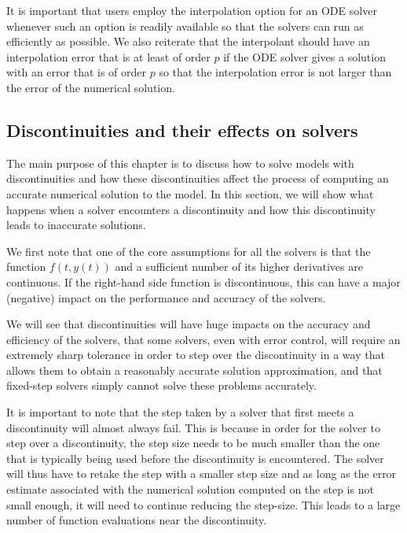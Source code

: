It is important that users employ the interpolation option for an ODE solver whenever such an option is readily available so that the solvers can run as efficiently as possible. We also reiterate that the interpolant should have an interpolation error that is at least of order $p$ if the ODE solver gives a solution with an error that is of order $p$ so that the interpolation error is not larger than the error of the numerical solution.

\subsection{Discontinuities and their effects on solvers}
\label{subsection:effect_of_discontinuity}
The main purpose of this chapter is to discuss how to solve models with discontinuities and how these discontinuities affect the process of computing an accurate numerical solution to the model. In this section, we will show what happens when a solver encounters a discontinuity and how this discontinuity leads to inaccurate solutions.

We first note that one of the core assumptions for all the solvers is that the function $f(t, y(t))$ and a sufficient number of its higher derivatives are continuous. If the right-hand side function is discontinuous, this can have a major (negative) impact on the performance and accuracy of the solvers. 

We will see that discontinuities will have huge impacts on the accuracy and efficiency of the solvers, that some solvers, even with error control, will require an extremely sharp tolerance in order to step over the discontinuity in a way that allows them to obtain a reasonably accurate solution approximation, and that fixed-step solvers simply cannot solve these problems accurately. 

It is important to note that the step taken by a solver that first meets a discontinuity will almost always fail. This is because in order for the solver to step over a discontinuity, the step size needs to be much smaller than the one that is typically being used before the discontinuity is encountered. The solver will thus have to retake the step with a smaller step size and as long as the error estimate associated with the numerical solution computed on the step is not small enough, it will need to continue reducing the step-size. This leads to a large number of function evaluations near the discontinuity. 

